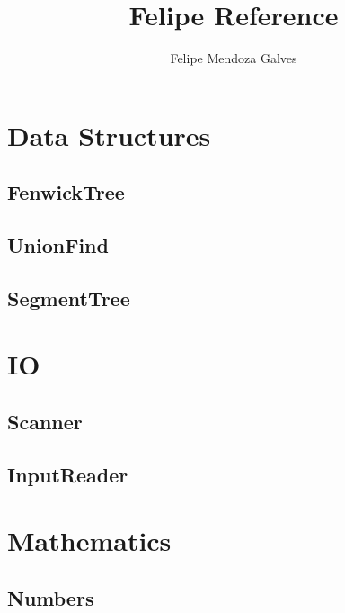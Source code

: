 \documentclass[10pt]{article}
\title{Felipe Reference}
\author{Felipe Mendoza Galves}
\date{}
\begin{document}
	
	\maketitle
	\newpage
	\tableofcontents
	\newpage
	
	\section{Data Structures}
	\subsection{FenwickTree}
	\subsection{UnionFind}
	\subsection{SegmentTree}
	
	\newpage
	\section{IO}
	\subsection{Scanner}
	\subsection{InputReader}
	
	\newpage
	\section{Mathematics}
	\subsection{Numbers}
	
		

	
	
	
\end{document}
